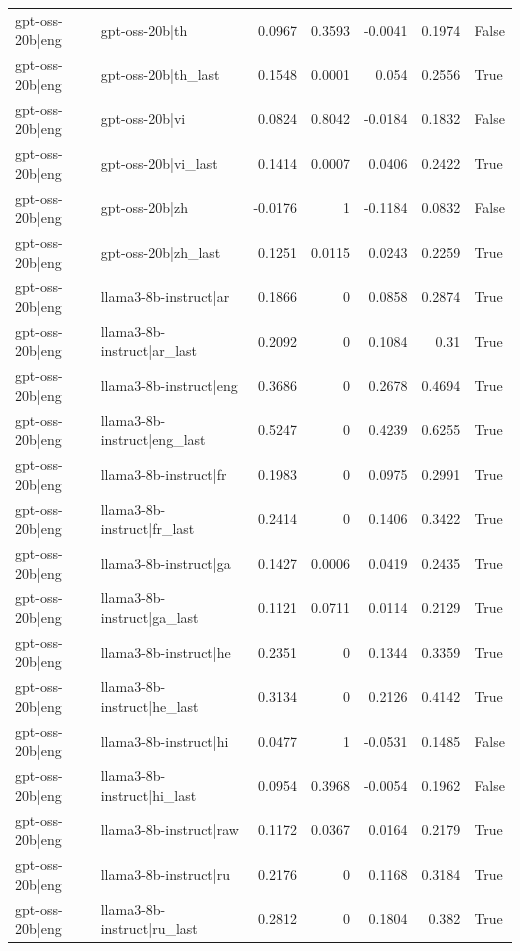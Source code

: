 \begin{table}
\begin{tabular}{l l r r r r l}
gpt-oss-20b|eng & gpt-oss-20b|th & 0.0967 & 0.3593 & -0.0041 & 0.1974 & False \\
gpt-oss-20b|eng & gpt-oss-20b|th_last & 0.1548 & 0.0001 & 0.054 & 0.2556 & True \\
gpt-oss-20b|eng & gpt-oss-20b|vi & 0.0824 & 0.8042 & -0.0184 & 0.1832 & False \\
gpt-oss-20b|eng & gpt-oss-20b|vi_last & 0.1414 & 0.0007 & 0.0406 & 0.2422 & True \\
gpt-oss-20b|eng & gpt-oss-20b|zh & -0.0176 & 1 & -0.1184 & 0.0832 & False \\
gpt-oss-20b|eng & gpt-oss-20b|zh_last & 0.1251 & 0.0115 & 0.0243 & 0.2259 & True \\
gpt-oss-20b|eng & llama3-8b-instruct|ar & 0.1866 & 0 & 0.0858 & 0.2874 & True \\
gpt-oss-20b|eng & llama3-8b-instruct|ar_last & 0.2092 & 0 & 0.1084 & 0.31 & True \\
gpt-oss-20b|eng & llama3-8b-instruct|eng & 0.3686 & 0 & 0.2678 & 0.4694 & True \\
gpt-oss-20b|eng & llama3-8b-instruct|eng_last & 0.5247 & 0 & 0.4239 & 0.6255 & True \\
gpt-oss-20b|eng & llama3-8b-instruct|fr & 0.1983 & 0 & 0.0975 & 0.2991 & True \\
gpt-oss-20b|eng & llama3-8b-instruct|fr_last & 0.2414 & 0 & 0.1406 & 0.3422 & True \\
gpt-oss-20b|eng & llama3-8b-instruct|ga & 0.1427 & 0.0006 & 0.0419 & 0.2435 & True \\
gpt-oss-20b|eng & llama3-8b-instruct|ga_last & 0.1121 & 0.0711 & 0.0114 & 0.2129 & True \\
gpt-oss-20b|eng & llama3-8b-instruct|he & 0.2351 & 0 & 0.1344 & 0.3359 & True \\
gpt-oss-20b|eng & llama3-8b-instruct|he_last & 0.3134 & 0 & 0.2126 & 0.4142 & True \\
gpt-oss-20b|eng & llama3-8b-instruct|hi & 0.0477 & 1 & -0.0531 & 0.1485 & False \\
gpt-oss-20b|eng & llama3-8b-instruct|hi_last & 0.0954 & 0.3968 & -0.0054 & 0.1962 & False \\
gpt-oss-20b|eng & llama3-8b-instruct|raw & 0.1172 & 0.0367 & 0.0164 & 0.2179 & True \\
gpt-oss-20b|eng & llama3-8b-instruct|ru & 0.2176 & 0 & 0.1168 & 0.3184 & True \\
gpt-oss-20b|eng & llama3-8b-instruct|ru_last & 0.2812 & 0 & 0.1804 & 0.382 & True \\

\end{tabular}
\end{table}
